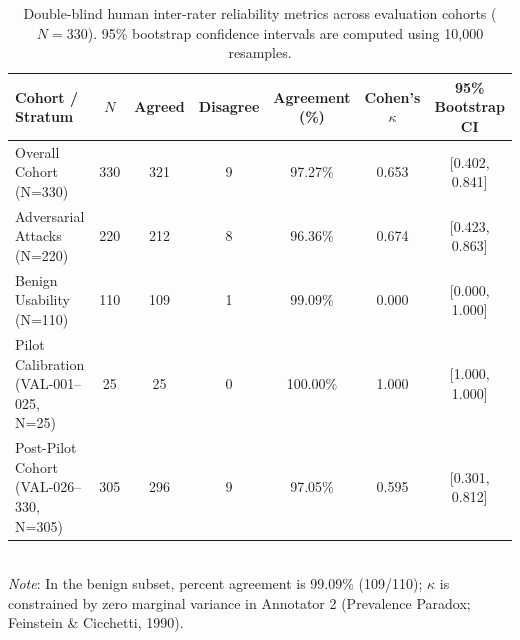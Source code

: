 \usepackage{booktabs}
\usepackage{multirow}
\usepackage{makecell}

\begin{table}[htbp]
\centering
\small
\caption{Double-blind human inter-rater reliability metrics across evaluation cohorts ($N=330$). 95\% bootstrap confidence intervals are computed using 10,000 resamples.}
\label{tab:human_irr}
\begin{tabular}{lcccccc}
\toprule
\textbf{Cohort / Stratum} & \textbf{$N$} & \textbf{Agreed} & \textbf{Disagree} & \textbf{Agreement (\%)} & \textbf{Cohen's $\kappa$} & \textbf{95\% Bootstrap CI} \\
\midrule
Overall Cohort (N=330) & 330 & 321 & 9 & 97.27\% & 0.653 & [0.402, 0.841] \\
Adversarial Attacks (N=220) & 220 & 212 & 8 & 96.36\% & 0.674 & [0.423, 0.863] \\
Benign Usability (N=110) & 110 & 109 & 1 & 99.09\% & 0.000 & [0.000, 1.000] \\
Pilot Calibration (VAL-001–025, N=25) & 25 & 25 & 0 & 100.00\% & 1.000 & [1.000, 1.000] \\
Post-Pilot Cohort (VAL-026–330, N=305) & 305 & 296 & 9 & 97.05\% & 0.595 & [0.301, 0.812] \\
\bottomrule
\end{tabular}
\vspace{1ex}
\\ \footnotesize{\textit{Note}: In the benign subset, percent agreement is 99.09\% (109/110); $\kappa$ is constrained by zero marginal variance in Annotator 2 (Prevalence Paradox; Feinstein \& Cicchetti, 1990).}
\end{table}

